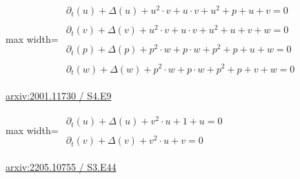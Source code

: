 \documentclass[10pt,a4paper]{article}
\begin{document}
\begin{minipage}{\linewidth}
\begin{center}\begin{adjustbox}{max width=\linewidth}$\displaystyle\begin{gathered}\begin{gathered}\partial_{t}(u)+\Delta(u)+u^{2}\cdot v+u\cdot v+u^{2}+p+u+v=0\end{gathered}\\[5pt]\begin{gathered}\partial_{t}(v)+\Delta(v)+u^{2}\cdot v+u\cdot v+u^{2}+u+v+w=0\end{gathered}\\[5pt]\begin{gathered}\partial_{t}(p)+\Delta(p)+p^{2}\cdot w+p\cdot w+p^{2}+p+u+w=0\end{gathered}\\[5pt]\begin{gathered}\partial_{t}(w)+\Delta(w)+p^{2}\cdot w+p\cdot w+p^{2}+p+v+w=0\end{gathered}\end{gathered}$\end{adjustbox}\end{center}
{\small \href{https://arxiv.org/html/2001.11730#S4.E9}{arxiv:2001.11730 / S4.E9}}\par
\end{minipage}\par\vspace{7mm}

\begin{minipage}{\linewidth}
\begin{center}\begin{adjustbox}{max width=\linewidth}$\displaystyle\begin{gathered}\begin{gathered}\partial_{t}(u)+\Delta(u)+v^{2}\cdot u+1+u=0\end{gathered}\\[5pt]\begin{gathered}\partial_{t}(v)+\Delta(v)+v^{2}\cdot u+v=0\end{gathered}\end{gathered}$\end{adjustbox}\end{center}
{\small \href{https://arxiv.org/html/2205.10755#S3.E44}{arxiv:2205.10755 / S3.E44}}\par
\end{minipage}\par\vspace{7mm}
\end{document}
